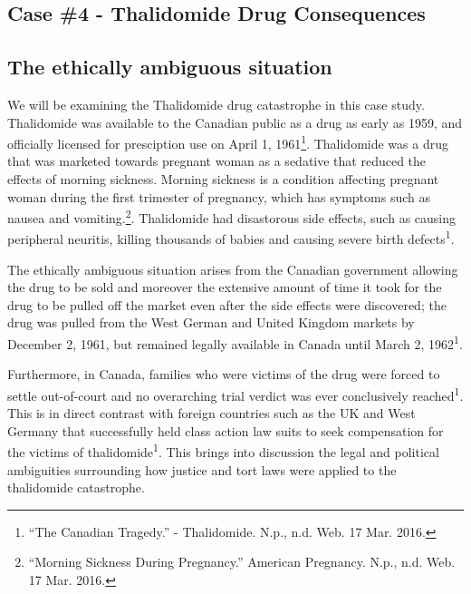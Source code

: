\documentclass[8pt]{article}
\newcommand{\q}[1]{``#1''}
\begin{document}
\begin{center}\section*{Case \#4 - Thalidomide Drug Consequences}\end{center}

\subsection{The ethically ambiguous situation} 

We will be examining the Thalidomide drug catastrophe in this case study. Thalidomide was available to the Canadian public as a drug as early as 1959, and officially licensed for presciption use on April 1, 1961\footnote{\q{The Canadian Tragedy.} - Thalidomide. N.p., n.d. Web. 17 Mar. 2016.}. Thalidomide was a drug that was marketed towards pregnant woman as a sedative that reduced the effects of morning sickness. Morning sickness is a condition affecting pregnant woman during the first trimester of pregnancy, which has symptoms such as nausea and vomiting.\footnote{\q{Morning Sickness During Pregnancy.} American Pregnancy. N.p., n.d. Web. 17 Mar. 2016.}. Thalidomide had disastorous side effects, such as causing peripheral neuritis, killing thousands of babies and causing severe birth defects\textsuperscript{1}.  \par

The ethically ambiguous situation arises from the Canadian government allowing the drug to be sold and moreover the extensive amount of time it took for the drug to be pulled off the market even after the side effects were discovered; the drug was pulled from the West German and United Kingdom markets by December 2, 1961, but remained legally available in Canada until March 2, 1962\textsuperscript{1}. \par

Furthermore, in Canada, families who were victims of the drug were forced to settle out-of-court and no overarching trial verdict was ever conclusively reached\textsuperscript{1}. This is in direct contrast with foreign countries such as the UK and West Germany that successfully held class action law suits to seek compensation for the victims of thalidomide\textsuperscript{1}. This brings into discussion the legal and political ambiguities surrounding how justice and tort laws were applied to the thalidomide catastrophe.   \par
\end{document}
